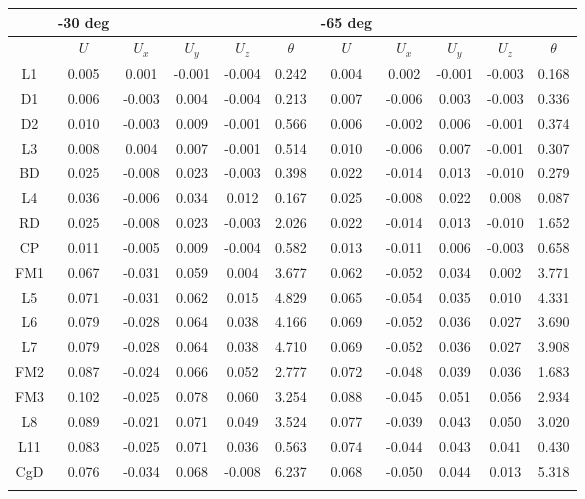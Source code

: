 \documentclass{report}
\begin{document}
\begin{table}
\begin{center}
\begin{tabular}{c|ccccc|ccccc}
& {\bf -30 deg} & & & & & {\bf -65 deg} & & & \\
\hline
\hline
& $U$ & $U_x$ & $U_y$ & $U_z$ & $\theta$ & $U$ & $U_x$ & $U_y$ & $U_z$ & $\theta$ \\
\hline
L1	&	0.005	&	0.001	&	-0.001	&	-0.004	&	0.242	&	0.004	&	0.002	&	-0.001	&	-0.003	&	0.168	\\
D1	&	0.006	&	-0.003	&	0.004	&	-0.004	&	0.213	&	0.007	&	-0.006	&	0.003	&	-0.003	&	0.336	\\
D2	&	0.010	&	-0.003	&	0.009	&	-0.001	&	0.566	&	0.006	&	-0.002	&	0.006	&	-0.001	&	0.374	\\
L3	&	0.008	&	0.004	&	0.007	&	-0.001	&	0.514	&	0.010	&	-0.006	&	0.007	&	-0.001	&	0.307	\\
BD	&	0.025	&	-0.008	&	0.023	&	-0.003	&	0.398	&	0.022	&	-0.014	&	0.013	&	-0.010	&	0.279	\\
L4	&	0.036	&	-0.006	&	0.034	&	0.012	&	0.167	&	0.025	&	-0.008	&	0.022	&	0.008	&	0.087	\\
RD	&	0.025	&	-0.008	&	0.023	&	-0.003	&	2.026	&	0.022	&	-0.014	&	0.013	&	-0.010	&	1.652	\\
CP	&	0.011	&	-0.005	&	0.009	&	-0.004	&	0.582	&	0.013	&	-0.011	&	0.006	&	-0.003	&	0.658	\\
FM1	&	0.067	&	-0.031	&	0.059	&	0.004	&	3.677	&	0.062	&	-0.052	&	0.034	&	0.002	&	3.771	\\
L5	&	0.071	&	-0.031	&	0.062	&	0.015	&	4.829	&	0.065	&	-0.054	&	0.035	&	0.010	&	4.331	\\
L6	&	0.079	&	-0.028	&	0.064	&	0.038	&	4.166	&	0.069	&	-0.052	&	0.036	&	0.027	&	3.690	\\
L7	&	0.079	&	-0.028	&	0.064	&	0.038	&	4.710	&	0.069	&	-0.052	&	0.036	&	0.027	&	3.908	\\
FM2	&	0.087	&	-0.024	&	0.066	&	0.052	&	2.777	&	0.072	&	-0.048	&	0.039	&	0.036	&	1.683	\\
FM3	&	0.102	&	-0.025	&	0.078	&	0.060	&	3.254	&	0.088	&	-0.045	&	0.051	&	0.056	&	2.934	\\
L8	&	0.089	&	-0.021	&	0.071	&	0.049	&	3.524	&	0.077	&	-0.039	&	0.043	&	0.050	&	3.020	\\
L11	&	0.083	&	-0.025	&	0.071	&	0.036	&	0.563	&	0.074	&	-0.044	&	0.043	&	0.041	&	0.430	\\
CgD	&	0.076	&	-0.034	&	0.068	&	-0.008	&	6.237	&	0.068	&	-0.050	&	0.044	&	0.013	&	5.318	\\
\hline \\
\end{tabular}
\end{center}
\end{table}
\end{document}
